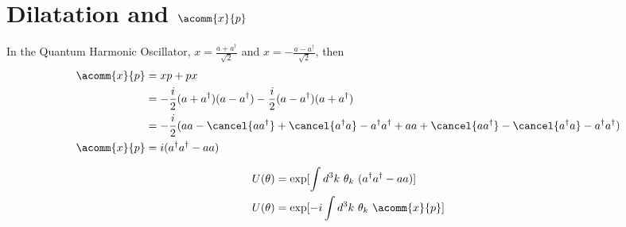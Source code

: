 \documentclass[]{article}
\numberwithin{equation}{section}
\begin{document}
\section{Dilatation and $\acomm{x}{p}$}	
In the Quantum Harmonic Oscillator, $x=\frac{a+a^{\dagger}}{\sqrt{2}}$ and $x=-\frac{a-a^{\dagger}}{\sqrt{2}}$, then
\begin{align}
    \acomm{x}{p}&=xp+px\\
    &=-\frac{i}{2}(a+a^{\dagger})(a-a^{\dagger})-\frac{i}{2}(a-a^{\dagger})(a+a^{\dagger})\\
    &=-\frac{i}{2}(aa-\cancel{aa^{\dagger}}+\cancel{a^{\dagger}a}-a^{\dagger}a^{\dagger}+aa+\cancel{aa^{\dagger}}-\cancel{a^{\dagger}a}-a^{\dagger}a^{\dagger})\\
    \acomm{x}{p}&=i(a^{\dagger}a^{\dagger}-aa)
\end{align}

\begin{align}
    U(\theta)&=\exp[\int d^3k ~\theta_k ~(a^{\dagger}a^{\dagger}-aa) ]\\
    U(\theta)&=\exp[-i\int d^3k~ \theta_k ~\acomm{x}{p} ]\\
\end{align}
\end{document}
